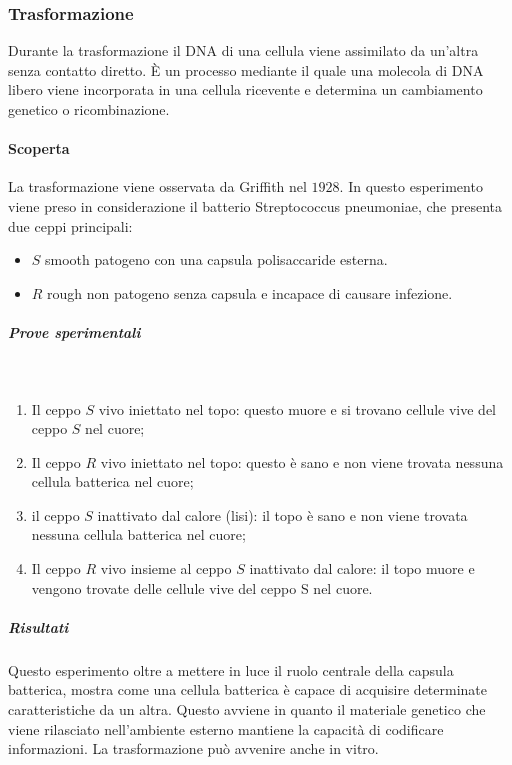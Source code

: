 		\subsubsection{Trasformazione}
		Durante la trasformazione il DNA di una cellula viene assimilato da un'altra senza contatto diretto.
		\`E un processo mediante il quale una molecola di DNA libero viene incorporata in una cellula ricevente e determina un cambiamento genetico o ricombinazione.

			\paragraph{Scoperta}
			La trasformazione viene osservata da Griffith nel $1928$.
			In questo esperimento viene preso in considerazione il batterio Streptococcus pneumoniae, che presenta due ceppi principali:
			\begin{multicols}{2}
				\begin{itemize}
					\item $S$ smooth patogeno con una capsula polisaccaride esterna.
					\item $R$ rough non patogeno senza capsula e incapace di causare infezione.
				\end{itemize}
			\end{multicols}
				
				\subparagraph{Prove sperimentali}\mbox{}\\
				\begin{multicols}{2}
					\begin{enumerate}
    						\item Il ceppo $S$ vivo iniettato nel topo: questo muore e si trovano cellule vive del ceppo $S$ nel cuore; 
    						\item Il ceppo $R$ vivo iniettato nel topo: questo è sano e non viene trovata nessuna cellula batterica nel cuore;
    						\item il ceppo $S$ inattivato dal calore (lisi): il topo è sano e non viene trovata nessuna cellula batterica nel cuore; 
    						\item Il ceppo $R$ vivo insieme al ceppo $S$ inattivato dal calore: il topo muore e vengono trovate delle cellule vive del ceppo S nel cuore.
					\end{enumerate}
				\end{multicols}

				\subparagraph{Risultati}
				Questo esperimento oltre a mettere in luce il ruolo centrale della capsula batterica, mostra come una cellula batterica è capace di acquisire determinate caratteristiche da un altra. 
				Questo avviene in quanto il materiale genetico che viene rilasciato nell'ambiente esterno mantiene la capacità di codificare informazioni.
				La trasformazione pu\`o avvenire anche in vitro.

